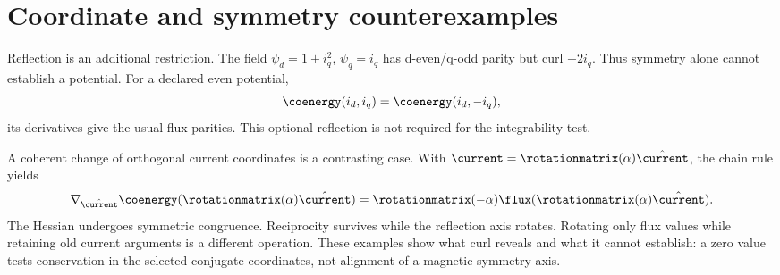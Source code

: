 \section{Coordinate and symmetry counterexamples}
\label{sec:symmetry}
Reflection is an additional restriction. The field $\psi_d=1+i_q^2$,
$\psi_q=i_q$ has d-even/q-odd parity but curl $-2i_q$. Thus symmetry alone
cannot establish a potential. For a declared even potential,
\begin{equation}
 \coenergy(i_d,i_q)=\coenergy(i_d,-i_q),\label{eq:energy-parity}
\end{equation}
its derivatives give the usual flux parities. This optional reflection is
not required for the integrability test.

A coherent change of orthogonal current coordinates is a contrasting case.
With $\current=\rotationmatrix(\alpha)\hat\current$, the chain rule yields
\begin{equation}
 \nabla_{\hat\current}\coenergy(\rotationmatrix(\alpha)\hat\current)
 =\rotationmatrix(-\alpha)\flux(\rotationmatrix(\alpha)\hat\current).
 \label{eq:rotated-potential}
\end{equation}
The Hessian undergoes symmetric congruence. Reciprocity survives while the
reflection axis rotates. Rotating only flux values while retaining old current
arguments is a different operation. These examples show what curl reveals
and what it cannot establish: a zero value tests conservation in the selected
conjugate coordinates, not alignment of a magnetic symmetry axis.
